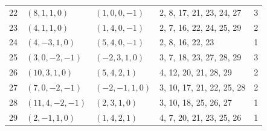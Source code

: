 \documentclass[11pt,a4paper]{amsart}
\theoremstyle{remark}
\begin{document}
{\begin{longtable}{rllll}
22 & $(8, 1, 1, 0)$ & $(1, 0, 0, -1)$ & 2, 8, 17, 21, 23, 24, 27 & 3 \\
23 & $(4, 1, 1, 0)$ & $(1, 4, 0, -1)$ & 2, 7, 16, 22, 24, 25, 29 & 2 \\
24 & $(4, -3, 1, 0)$ & $(5, 4, 0, -1)$ & 2, 8, 16, 22, 23 & 1 \\
25 & $(3, 0, -2, -1)$ & $(-2, 3, 1, 0)$ & 3, 7, 18, 23, 27, 28, 29 & 3 \\
26 & $(10, 3, 1, 0)$ & $(5, 4, 2, 1)$ & 4, 12, 20, 21, 28, 29 & 2 \\
27 & $(7, 0, -2, -1)$ & $(-2, -1, 1, 0)$ & 3, 10, 17, 21, 22, 25, 28 & 2 \\
28 & $(11, 4, -2, -1)$ & $(2, 3, 1, 0)$ & 3, 10, 18, 25, 26, 27 & 1 \\
29 & $(2, -1, 1, 0)$ & $(1, 4, 2, 1)$ & 4, 7, 20, 21, 23, 25, 26 & 1 \\
\bottomrule
\end{longtable}
}
\end{document}
